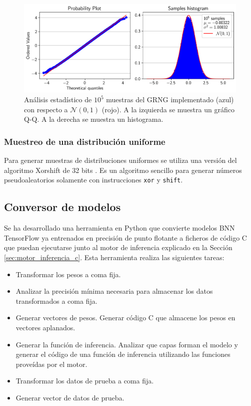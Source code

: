 \begin{figure}[h]
    \centering
    \includegraphics[width=\textwidth]{root/Imagenes/4_bnn_riscv/gaus_aprox.png}
    \caption{Análisis estadístico de $10^5$ muestras del GRNG implementado (azul) con respecto a $\mathcal{N}(0,1)$ (rojo). A la izquierda se muestra un gráfico Q-Q. A la derecha se muestra un histograma.}
    \label{fig:gauss_aprox}
\end{figure}

\subsubsection{Muestreo de una distribución uniforme}

Para generar muestras de distribuciones uniformes se utiliza una versión del algoritmo Xorshift de 32 bits \cite{xorshift}. Es un algoritmo sencillo para generar números pseudoaleatorios solamente con instrucciones \texttt{xor} y \texttt{shift}.

\subsection{Conversor de modelos}

Se ha desarrollado una herramienta en Python que convierte modelos BNN TensorFlow ya entrenados en precisión de punto flotante a ficheros de código C que puedan ejecutarse junto al motor de inferencia explicado en la Sección \ref{sec:motor_inferencia_c}. Esta herramienta realiza las siguientes tareas:

\begin{itemize}
    \item Transformar los pesos a coma fija.
    \item Analizar la precisión mínima necesaria para almacenar los datos transformados a coma fija.
    \item Generar vectores de pesos. Generar código C que almacene los pesos en vectores aplanados.
    \item Generar la función de inferencia. Analizar que capas forman el modelo y generar el código de una función de inferencia utilizando las funciones proveídas por el motor.
    \item Transformar los datos de prueba a coma fija.
    \item Generar vector de datos de prueba.
\end{itemize}

